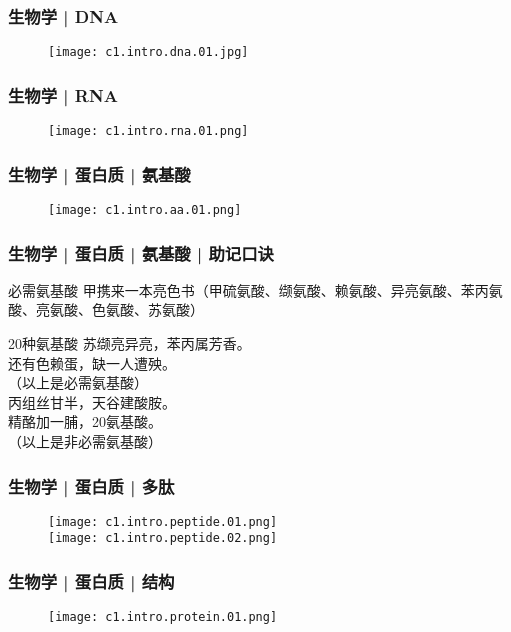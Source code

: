 \begin{frame}
  \frametitle{生物学 | \alert{DNA}}
  \begin{figure}
    \centering
    \texttt{[image: c1.intro.dna.01.jpg]}
  \end{figure}
\end{frame}

\begin{frame}
  \frametitle{生物学 | \alert{RNA}}
  \begin{figure}
    \centering
    \texttt{[image: c1.intro.rna.01.png]}
  \end{figure}
\end{frame}

\begin{frame}
  \frametitle{生物学 | 蛋白质 | \alert{氨基酸}}
  \begin{figure}
    \centering
    \texttt{[image: c1.intro.aa.01.png]}
  \end{figure}
\end{frame}

\begin{frame}
  \frametitle{生物学 | 蛋白质 | 氨基酸 | 助记口诀}
  \begin{block}{必需氨基酸}
  甲携来一本亮色书（甲硫氨酸、缬氨酸、赖氨酸、异亮氨酸、苯丙氨酸、亮氨酸、色氨酸、苏氨酸）
\end{block}
\pause
\begin{block}{20种氨基酸}
  苏缬亮异亮，苯丙属芳香。\\
  还有色赖蛋，缺一人遭殃。\\
  （以上是必需氨基酸）\\
  丙组丝甘半，天谷建酸胺。\\
  精酪加一脯，20氨基酸。\\
  （以上是非必需氨基酸）
\end{block}
\end{frame}

\begin{frame}
  \frametitle{生物学 | 蛋白质 | 多肽}
  \begin{figure}
    \centering
    \texttt{[image: c1.intro.peptide.01.png]}\\
    \texttt{[image: c1.intro.peptide.02.png]}
  \end{figure}
\end{frame}

\begin{frame}
  \frametitle{生物学 | 蛋白质 | 结构}
  \begin{figure}
    \centering
    \texttt{[image: c1.intro.protein.01.png]}
  \end{figure}
\end{frame}

